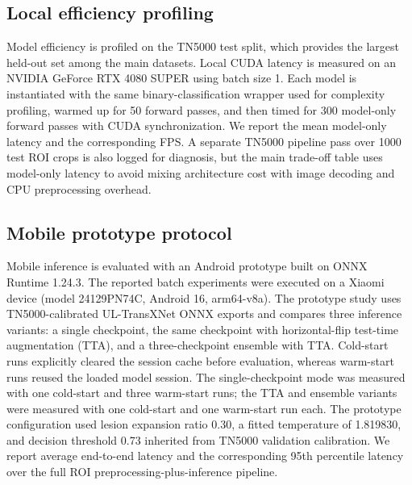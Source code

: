 \subsection{Local efficiency profiling}
Model efficiency is profiled on the TN5000 test split, which provides the largest held-out set among the main datasets. Local CUDA latency is measured on an NVIDIA GeForce RTX 4080 SUPER using batch size 1. Each model is instantiated with the same binary-classification wrapper used for complexity profiling, warmed up for 50 forward passes, and then timed for 300 model-only forward passes with CUDA synchronization. We report the mean model-only latency and the corresponding FPS. A separate TN5000 pipeline pass over 1000 test ROI crops is also logged for diagnosis, but the main trade-off table uses model-only latency to avoid mixing architecture cost with image decoding and CPU preprocessing overhead.

\subsection{Mobile prototype protocol}
Mobile inference is evaluated with an Android prototype built on ONNX Runtime 1.24.3. The reported batch experiments were executed on a Xiaomi device (model 24129PN74C, Android 16, arm64-v8a). The prototype study uses TN5000-calibrated UL-TransXNet ONNX exports and compares three inference variants: a single checkpoint, the same checkpoint with horizontal-flip test-time augmentation (TTA), and a three-checkpoint ensemble with TTA. Cold-start runs explicitly cleared the session cache before evaluation, whereas warm-start runs reused the loaded model session. The single-checkpoint mode was measured with one cold-start and three warm-start runs; the TTA and ensemble variants were measured with one cold-start and one warm-start run each. The prototype configuration used lesion expansion ratio 0.30, a fitted temperature of 1.819830, and decision threshold 0.73 inherited from TN5000 validation calibration. We report average end-to-end latency and the corresponding 95th percentile latency over the full ROI preprocessing-plus-inference pipeline.
